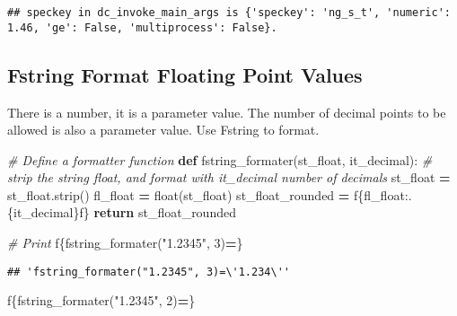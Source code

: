 \documentclass[
]{book}
\newenvironment{Shaded}{\begin{snugshade}}{\end{snugshade}}
\newcommand{\BuiltInTok}[1]{#1}
\newcommand{\CommentTok}[1]{\textcolor[rgb]{0.56,0.35,0.01}{\textit{#1}}}
\newcommand{\ControlFlowTok}[1]{\textcolor[rgb]{0.13,0.29,0.53}{\textbf{#1}}}
\newcommand{\DecValTok}[1]{\textcolor[rgb]{0.00,0.00,0.81}{#1}}
\newcommand{\KeywordTok}[1]{\textcolor[rgb]{0.13,0.29,0.53}{\textbf{#1}}}
\newcommand{\NormalTok}[1]{#1}
\newcommand{\OperatorTok}[1]{\textcolor[rgb]{0.81,0.36,0.00}{\textbf{#1}}}
\newcommand{\SpecialCharTok}[1]{\textcolor[rgb]{0.00,0.00,0.00}{#1}}
\newcommand{\SpecialStringTok}[1]{\textcolor[rgb]{0.31,0.60,0.02}{#1}}
\newcommand{\StringTok}[1]{\textcolor[rgb]{0.31,0.60,0.02}{#1}}
\begin{document}
\begin{verbatim}
## speckey in dc_invoke_main_args is {'speckey': 'ng_s_t', 'numeric': 1.46, 'ge': False, 'multiprocess': False}.
\end{verbatim}

\hypertarget{fstring-format-floating-point-values}{%
\subsection{Fstring Format Floating Point Values}\label{fstring-format-floating-point-values}}

There is a number, it is a parameter value. The number of decimal points to be allowed is also a parameter value. Use Fstring to format.

\begin{Shaded}
\begin{Highlighting}[]
\CommentTok{\# Define a formatter function}
\KeywordTok{def}\NormalTok{ fstring\_formater(st\_float, it\_decimal):}
    \CommentTok{\# strip the string float, and format with it\_decimal number of decimals}
\NormalTok{    st\_float }\OperatorTok{=}\NormalTok{ st\_float.strip()}
\NormalTok{    fl\_float }\OperatorTok{=} \BuiltInTok{float}\NormalTok{(st\_float)}
\NormalTok{    st\_float\_rounded }\OperatorTok{=} \SpecialStringTok{f\textquotesingle{}}\SpecialCharTok{\{}\NormalTok{fl\_float}\SpecialCharTok{:.}\NormalTok{\{it\_decimal\}}\SpecialCharTok{f\}}\SpecialStringTok{\textquotesingle{}}
    \ControlFlowTok{return}\NormalTok{ st\_float\_rounded}
    
\CommentTok{\# Print }
\SpecialStringTok{f\textquotesingle{}}\SpecialCharTok{\{}\NormalTok{fstring\_formater(}\StringTok{"1.2345"}\NormalTok{, }\DecValTok{3}\NormalTok{)}\OperatorTok{=}\SpecialCharTok{\}}\SpecialStringTok{\textquotesingle{}}
\end{Highlighting}
\end{Shaded}

\begin{verbatim}
## 'fstring_formater("1.2345", 3)=\'1.234\''
\end{verbatim}

\begin{Shaded}
\begin{Highlighting}[]
\SpecialStringTok{f\textquotesingle{}}\SpecialCharTok{\{}\NormalTok{fstring\_formater(}\StringTok{"1.2345"}\NormalTok{, }\DecValTok{2}\NormalTok{)}\OperatorTok{=}\SpecialCharTok{\}}\SpecialStringTok{\textquotesingle{}}
\end{Highlighting}
\end{Shaded}
\end{document}
